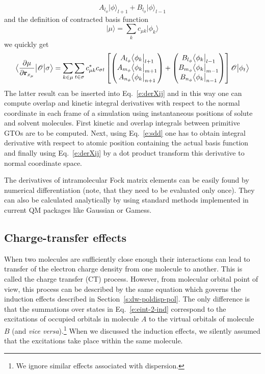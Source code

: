 \documentclass[a4paper,titlepage,twoside,fleqn,12pt]{book}
\newcommand{\bra}[1]{\ensuremath{\bigl\langle {#1} \bigl\lvert}}
\newcommand{\ket}[1]{\ensuremath{\bigr\rvert {#1} \bigr\rangle}}
\newcommand{\tbraket}[3]{\ensuremath{\bigl\langle {#1} \bigl\lvert {#2} \bigl\lvert {#3} \bigr\rangle}}
\newcommand{\fderiv}[2]{\ensuremath{
    \frac{\partial #1}{\partial #2}}}
\begin{document}
\begin{refsection}
\begin{equation}
A_{l_\phi}  \ket{\phi}_{l+1} + B_{l_\phi}  \ket{\phi}_{l-1}
\end{equation}
%
and the definition of contracted basis function
%
\begin{equation}\label{e:muorb}
\ket{\mu} = \sum_k c_{\mu k} \ket{\phi_k}
\end{equation}
%
we quickly get
%
\begin{equation}\label{e:sdd}
\tbraket{\fderiv{\mu}{{\bf r}_{x_\mu}}}{ \mathscr{O} }{\sigma} =
\sum_{k\in\mu}\sum_{t\in\sigma}
c_{\mu k}^*c_{\sigma t}
  \left[
  \begin{pmatrix}
  A_{l_\phi} \bra{\phi_k}_{l+1} \\ 
  A_{m_\phi} \bra{\phi_k}_{m+1} \\ 
  A_{n_\phi} \bra{\phi_k}_{n+1}
  \end{pmatrix}
+
  \begin{pmatrix}
  B_{l_\phi} \bra{\phi_k}_{l-1} \\ 
  B_{m_\phi} \bra{\phi_k}_{m-1} \\ 
  B_{n_\phi} \bra{\phi_k}_{n-1}
  \end{pmatrix}
  \right]
\mathscr{O}\ket{\phi_t}
\end{equation}
%
The latter result can be inserted into Eq.~\eqref{e:derXij} and in this way
one can compute overlap and kinetic integral derivatives with respect to the normal coordinate
in each frame of a simulation using instantaneous positions of solute and solvent molecules.
First kinetic and overlap integrals between primitive GTOs are to be computed. Next,
using Eq.~\eqref{e:sdd} one has to obtain integral derivative with respect to atomic position
containing the actual basis function and finally using Eq.~\eqref{e:derXij} by a dot product
transform this derivative to normal coordinate space.

The derivatives of intramolecular Fock matrix elements can be easily found
by numerical  differentiation (note, that they need to be evaluated only once).
They can also be calculated analytically by using standard methods implemented
in current QM packages like {\sc Gaussian} or {\sc Gamess}.

\subsection{Charge-transfer effects\label{s:dw-ct}}

When two molecules are sufficiently close enough
their interactions can lead to transfer of the 
electron charge density from one molecule to another.
This is called the charge transfer (CT) process.
However, from molecular orbital point of view, this process can be 
described by the same equation which governs the induction
effects described in Section~\ref{s:dw-poldisp-pol}. The only difference
is that the summations over states in Eq.~\eqref{e:eint-2-ind} correspond to 
the excitations of occupied orbitals in molecule $A$ to
the virtual orbitals of molecule $B$ (and \emph{vice versa}).\footnote{We ignore similar effects
associated with dispersion.} 
When we discussed the induction effects, we silently assumed that
the excitations take place within the same molecule. 


\end{refsection}
\end{document}
